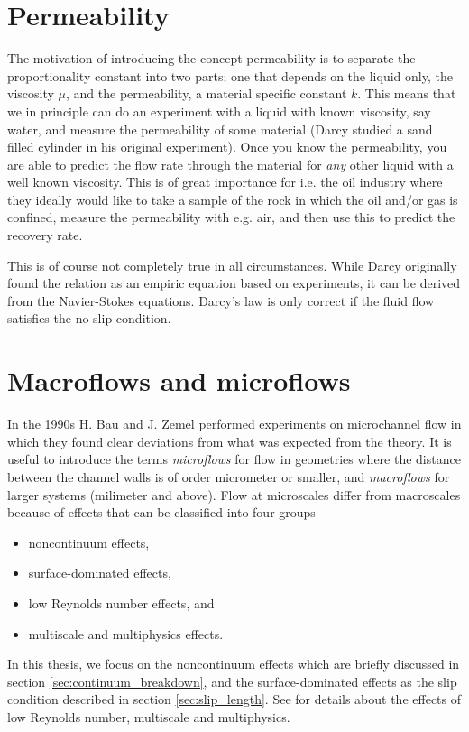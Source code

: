 \section{Permeability}
\label{sec:permeability}
The motivation of introducing the concept permeability is to separate the proportionality constant into two parts; one that depends on the liquid only, the viscosity $\mu$, and the permeability, a material specific constant $k$. This means that we in principle can do an experiment with a liquid with known viscosity, say water, and measure the permeability of some material (Darcy studied a sand filled cylinder in his original experiment). Once you know the permeability, you are able to predict the flow rate through the material for \textit{any} other liquid with a well known viscosity. This is of great importance for i.e. the oil industry where they ideally would like to take a sample of the rock in which the oil and/or gas is confined, measure the permeability with e.g. air, and then use this to predict the recovery rate.

This is of course not completely true in all circumstances. While Darcy originally found the relation as an empiric equation based on experiments, it can be derived from the Navier-Stokes equations. Darcy's law is only correct if the fluid flow satisfies the no-slip condition.
\section{Macroflows and microflows}
\label{sec:theory_of_fluids_microflows}
In the 1990s H. Bau and J. Zemel performed experiments on microchannel flow in which they found clear deviations from what was expected from the theory\cite{karniadakis2005microflows}. It is useful to introduce the terms \textit{microflows} for flow in geometries where the distance between the channel walls is of order micrometer or smaller, and \textit{macroflows} for larger systems (milimeter and above). Flow at microscales differ from macroscales because of effects that can be classified into four groups
\begin{itemize}
\item noncontinuum effects,
\item surface-dominated effects,
\item low Reynolds number effects, and
\item multiscale and multiphysics effects.
\end{itemize}
In this thesis, we focus on the noncontinuum effects which are briefly discussed in section \ref{sec:continuum_breakdown}, and the surface-dominated effects as the slip condition described in section \ref{sec:slip_length}. See \cite{karniadakis2005microflows} for details about the effects of low Reynolds number, multiscale and multiphysics. 

